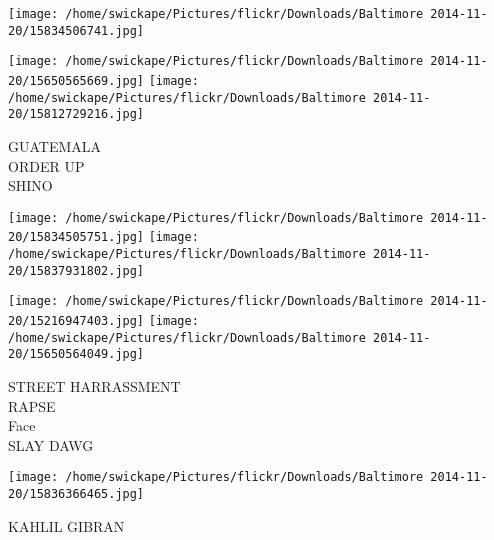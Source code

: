 \documentclass[10pt,letterpaper]{article}
\begin{document}
\texttt{[image: /home/swickape/Pictures/flickr/Downloads/Baltimore 2014-11-20/15834506741.jpg]}

\vspace{0.25in}
\texttt{[image: /home/swickape/Pictures/flickr/Downloads/Baltimore 2014-11-20/15650565669.jpg]}
\texttt{[image: /home/swickape/Pictures/flickr/Downloads/Baltimore 2014-11-20/15812729216.jpg]}

GUATEMALA\\
ORDER UP\\
SHINO
\pagebreak

\texttt{[image: /home/swickape/Pictures/flickr/Downloads/Baltimore 2014-11-20/15834505751.jpg]}
\texttt{[image: /home/swickape/Pictures/flickr/Downloads/Baltimore 2014-11-20/15837931802.jpg]}

\texttt{[image: /home/swickape/Pictures/flickr/Downloads/Baltimore 2014-11-20/15216947403.jpg]}
\texttt{[image: /home/swickape/Pictures/flickr/Downloads/Baltimore 2014-11-20/15650564049.jpg]}

STREET HARRASSMENT\\
RAPSE\\
Face\\
SLAY DAWG
\pagebreak

\texttt{[image: /home/swickape/Pictures/flickr/Downloads/Baltimore 2014-11-20/15836366465.jpg]}

KAHLIL GIBRAN
\pagebreak
\end{document}
